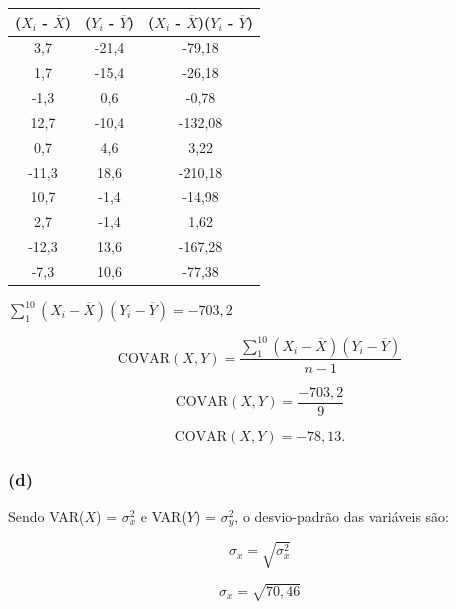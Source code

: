 \documentclass[hidelinks,11pt]{book}
\theoremstyle{definition}
\begin{document}
\begin{center}
	\begin{tabular}{|c|c|c|}\hline
		($X_i$ - $\overline{X}$) & ($Y_i$ - $\overline{Y}$) &($X_i$ - $\overline{X}$)($Y_i$ - $\overline{Y}$)  \\\hline
		3,7  & -21,4 & -79,18 \\\hline
		1,7 & -15,4 & -26,18 \\\hline
		-1,3 & 0,6 & -0,78 \\\hline
		12,7 & -10,4 & -132,08 \\\hline
		0,7 & 4,6 & 3,22 \\\hline
		-11,3 & 18,6 & -210,18 \\\hline
		10,7 & -1,4 & -14,98 \\\hline
		2,7 & -1,4 & 1,62 \\\hline
		-12,3 & 13,6 & -167,28 \\\hline
		-7,3 & 10,6 & -77,38 \\\hline 
	\end{tabular}
\end{center}

$\sum_{1}^{10}  (X_i - \overline{X})(Y_i - \overline{Y}) = -703,2$



\begin{displaymath}
	\textrm{COVAR}(X,Y) = \frac{\sum_{1}^{10}  (X_i - \overline{X})(Y_i - \overline{Y}) }{n-1}
\end{displaymath}

\begin{displaymath}
	\textrm{COVAR}(X,Y) = \frac{-703,2 }{9}
\end{displaymath}

\begin{displaymath}
	\textrm{COVAR}(X,Y) =-78,13.
\end{displaymath}

\subsubsection{(d)}

Sendo VAR($X$) = $\sigma_x^2$ e  VAR($Y$) = $\sigma_y^2$, o desvio-padrão das variáveis são:

\begin{displaymath}
	\sigma_x = \sqrt{\sigma_x^2}
\end{displaymath}

\begin{displaymath}
	\sigma_x = \sqrt{70,46}
\end{displaymath}
\end{document}
